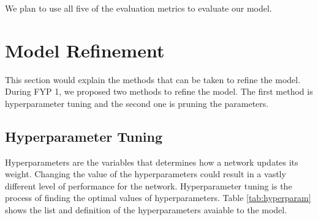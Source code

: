  We plan to use all five of the evaluation metrics to evaluate our model.

\section{Model Refinement}

This section would explain the methods that can be taken to refine the model. During FYP 1, we proposed two methods to refine the model. The first method is hyperparameter tuning and the second one is pruning the parameters. 
\subsection{Hyperparameter Tuning}

Hyperparameters are the variables that determines how a network updates its weight. Changing the value of the hyperparameters could result in a vastly different level of performance for the network. Hyperparameter tuning is the process of finding the optimal values of hyperparameters. Table \ref{tab:hyperparam} shows the list and definition of the hyperparameters avaiable to the model.
